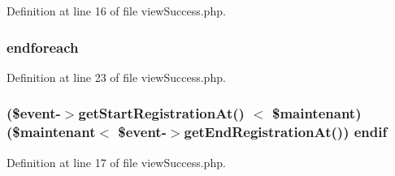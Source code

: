 Definition at line 16 of file view\-Success.\-php.

\hypertarget{frontend_2modules_2tournament_2templates_2view_success_8php_a672d9707ef91db026c210f98cc601123}{
\subsubsection[{endforeach}]{\setlength{\rightskip}{0pt plus 5cm}endforeach}}\label{frontend_2modules_2tournament_2templates_2view_success_8php_a672d9707ef91db026c210f98cc601123}


Definition at line 23 of file view\-Success.\-php.

\hypertarget{frontend_2modules_2tournament_2templates_2view_success_8php_a6a4e0258f03fd41cbc37d46e04b7be7f}{
\subsubsection[{endif}]{ (\$event-\/$>$get\-Start\-Registration\-At() $<$ \$maintenant) (\$maintenant$<$ \$event-\/$>$get\-End\-Registration\-At()) endif}}\label{frontend_2modules_2tournament_2templates_2view_success_8php_a6a4e0258f03fd41cbc37d46e04b7be7f}


Definition at line 17 of file view\-Success.\-php.

